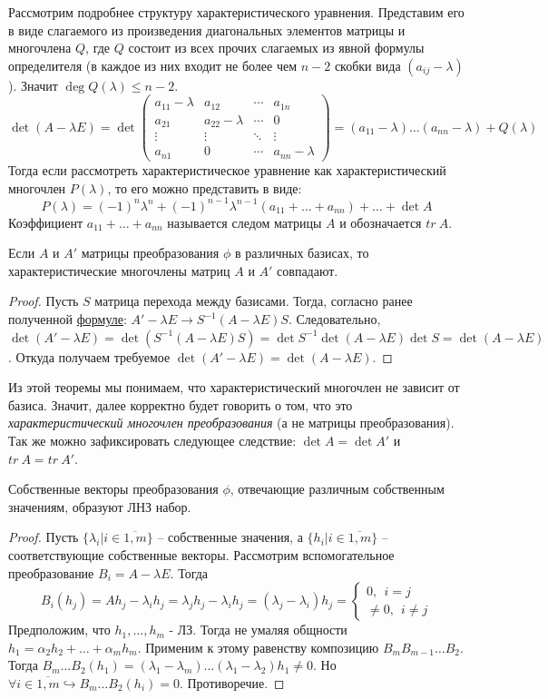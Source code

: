 
Рассмотрим подробнее структуру характеристического уравнения. Представим его в виде слагаемого из произведения диагональных элементов матрицы и многочлена $Q$, где $Q$ состоит из всех прочих слагаемых из явной формулы определителя (в каждое из них входит не более чем $n-2$ скобки вида $(a_{ij}-\lambda)$). Значит $\deg Q(\lambda) \leqslant n-2$.
\[
\det (A-\lambda E)=\det
        \begin{pmatrix}
        a_{11}-\lambda & a_{12} & \cdots & a_{1n} \\
        a_{21} & a_{22}-\lambda & \cdots & 0 \\
        \vdots & \vdots & \ddots & \vdots \\
        a_{n1} & 0 & \cdots & a_{nn}-\lambda
        \end{pmatrix}=(a_{11} - \lambda)\dots(a_{nn}-\lambda)+Q(\lambda)
\]
Тогда если рассмотреть характеристическое уравнение как характеристический многочлен $P(\lambda)$, то его можно представить в виде:
\[
P(\lambda)=(-1)^n\lambda^n+(-1)^{n-1}\lambda^{n-1}(a_{11}+\dots+a_{nn})+\dots+\det A
\]
Коэффициент $a_{11}+\dots+a_{nn}$ называется следом матрицы $A$ и  обозначается $tr\ A$.
\begin{theorem}
    Если $A$ и $A'$ матрицы преобразования $\phi$ в различных базисах, то характеристические многочлены матриц $A$ и $A'$ совпадают.
\end{theorem}
\begin{proof}
    Пусть $S$ матрица перехода между базисами. Тогда, согласно ранее полученной \hyperref[A']{формуле}: $A'-\lambda E \to S^{-1}(A-\lambda E)S$. Следовательно, $\det (A'-\lambda E)=\det (S^{-1}(A-\lambda E)S)=\det S^{-1} \det (A-\lambda E) \det S=\det (A-\lambda E)$. Откуда получаем требуемое $\det (A'-\lambda E)=\det (A-\lambda E)$.
\end{proof}
Из этой теоремы мы понимаем, что характеристический многочлен не зависит от базиса. Значит, далее корректно будет говорить о том, что это \textit{характеристический многочлен преобразования} (а не матрицы преобразования). Так же можно зафиксировать следующее следствие: $\det A=\det A'$ и $tr \ A=tr\ A'$.
\begin{proposition}
    Собственные векторы преобразования $\phi$, отвечающие различным собственным значениям, образуют ЛНЗ набор.
\end{proposition}
\begin{proof}
    Пусть $\{\lambda_i|i\in \overline{1,m}\}$ -- собственные значения, а $\{h_i|i\in \overline{1,m}\}$ -- соответствующие собственные векторы. Рассмотрим вспомогательное преобразование $B_i=A - \lambda E$. Тогда \[B_i(h_j)=Ah_j-\lambda_i h_j=\lambda_j h_j - \lambda_i h_j=(\lambda_j - \lambda_i)h_j = \begin{cases} 
   0, \ \ i=j \\
   \neq0, \ \ i \neq j 
\end{cases}\]
Предположим, что $h_1, \dots, h_m$ - ЛЗ. Тогда не умаляя общности $h_1=\alpha_2 h_2+\dots+\alpha_m h_m$. Применим к этому равенству композицию $B_mB_{m-1}\dots B_2$. Тогда $B_m\dots B_2(h_1)=(\lambda_1-\lambda_m)\dots (\lambda_1-\lambda_2)h_1\neq0$. Но $\forall i\in \overline{1,m}\hookrightarrow B_m\dots B_2(h_i)=0$. Противоречие.
\end{proof}
